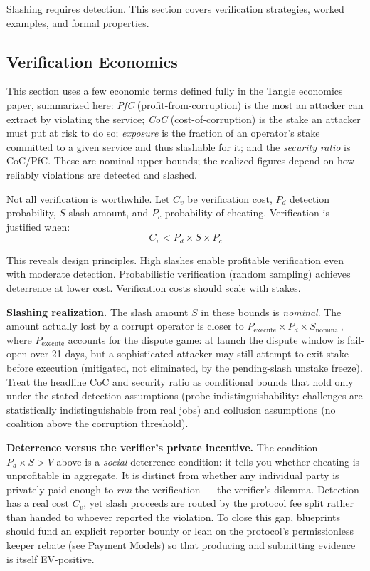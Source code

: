 \documentclass[11pt,a4paper]{article}
\begin{document}
Slashing requires detection. This section covers verification strategies, worked examples, and formal properties.

\subsection{Verification Economics}

This section uses a few economic terms defined fully in the Tangle economics paper, summarized here: \emph{PfC} (profit-from-corruption) is the most an attacker can extract by violating the service; \emph{CoC} (cost-of-corruption) is the stake an attacker must put at risk to do so; \emph{exposure} is the fraction of an operator's stake committed to a given service and thus slashable for it; and the \emph{security ratio} is CoC$/$PfC. These are nominal upper bounds; the realized figures depend on how reliably violations are detected and slashed.

Not all verification is worthwhile. Let $C_v$ be verification cost, $P_d$ detection probability, $S$ slash amount, and $P_c$ probability of cheating. Verification is justified when:
\[
C_v < P_d \times S \times P_c
\]

This reveals design principles. High slashes enable profitable verification even with moderate detection. Probabilistic verification (random sampling) achieves deterrence at lower cost. Verification costs should scale with stakes.

\textbf{Slashing realization.} The slash amount $S$ in these bounds is \emph{nominal}. The amount actually lost by a corrupt operator is closer to $P_{\text{execute}} \times P_d \times S_{\text{nominal}}$, where $P_{\text{execute}}$ accounts for the dispute game: at launch the dispute window is fail-open over 21 days, but a sophisticated attacker may still attempt to exit stake before execution (mitigated, not eliminated, by the pending-slash unstake freeze). Treat the headline CoC and security ratio as conditional bounds that hold only under the stated detection assumptions (probe-indistinguishability: challenges are statistically indistinguishable from real jobs) and collusion assumptions (no coalition above the corruption threshold).

\textbf{Deterrence versus the verifier's private incentive.} The condition $P_d \times S > V$ above is a \emph{social} deterrence condition: it tells you whether cheating is unprofitable in aggregate. It is distinct from whether any individual party is privately paid enough to \emph{run} the verification --- the verifier's dilemma. Detection has a real cost $C_v$, yet slash proceeds are routed by the protocol fee split rather than handed to whoever reported the violation. To close this gap, blueprints should fund an explicit reporter bounty or lean on the protocol's permissionless keeper rebate (see Payment Models) so that producing and submitting evidence is itself EV-positive.
\end{document}
